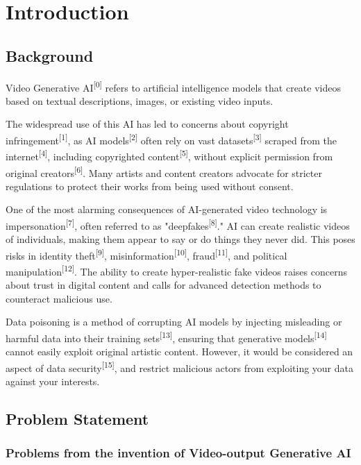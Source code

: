 \chapter{Introduction}
\label{chap:introduction}

\section{Background}
\label{section:background}

Video Generative AI\textsuperscript{[0]} refers to artificial intelligence models that create videos based on textual descriptions, images, or existing video inputs. 

The widespread use of this AI has led to concerns about copyright infringement\textsuperscript{[1]}, as AI models\textsuperscript{[2]} often rely on vast datasets\textsuperscript{[3]} scraped from the internet\textsuperscript{[4]}, including copyrighted content\textsuperscript{[5]}, without explicit permission from original creators\textsuperscript{[6]}. Many artists and content creators advocate for stricter regulations to protect their works from being used without consent.

One of the most alarming consequences of AI-generated video technology is impersonation\textsuperscript{[7]}, often referred to as "deepfakes\textsuperscript{[8]}." AI can create realistic videos of individuals, making them appear to say or do things they never did. This poses risks in identity theft\textsuperscript{[9]}, misinformation\textsuperscript{[10]}, fraud\textsuperscript{[11]}, and political manipulation\textsuperscript{[12]}. The ability to create hyper-realistic fake videos raises concerns about trust in digital content and calls for advanced detection methods to counteract malicious use.

Data poisoning is a method of corrupting AI models by injecting misleading or harmful data into their training sets\textsuperscript{[13]}, ensuring that generative models\textsuperscript{[14]} cannot easily exploit original artistic content. However, it would be considered an aspect of data security\textsuperscript{[15]}, and restrict malicious actors from exploiting your data against your interests.

\section{Problem Statement}
\label{section:problem-statement}

\subsection{Problems from the invention of Video-output Generative AI}
\label{subsection:Problems-From-Video-AI}

